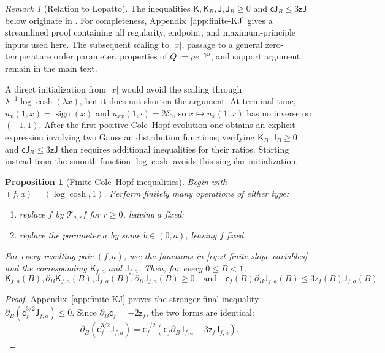 \documentclass[10pt]{amsart}
\newtheorem{proposition}[proposition]{Proposition}
\theoremstyle{definition}
\theoremstyle{remark}
\newtheorem{remark}[remark]{Remark}
\numberwithin{equation}{section}
\newcommand{\1}{\mathbf 1}
\begin{document}
\begin{remark}[Relation to Lopatto]
\label{rem:zt-finite-KJ}
The inequalities $\mathsf K,\mathsf K_B,\mathsf J,\mathsf J_B\geq0$ and $\mathsf c\mathsf J_B\leq3\mathsf z\mathsf J$ below originate in \cite[Proposition~3.6]{Lopatto2026v2}. For completeness, Appendix~\ref{app:finite-KJ} gives a streamlined proof containing all regularity, endpoint, and maximum-principle inputs used here. The subsequent scaling to $|x|$, passage to a general zero-temperature order parameter, properties of $Q:=\rho e^{-\gamma u}$, and support argument remain in the main text.

A direct initialization from $|x|$ would avoid the scaling through $\lambda^{-1}\log\cosh(\lambda x)$, but it does not shorten the argument. At terminal time, $u_x(1,x)=\operatorname{sign}(x)$ and $u_{xx}(1,\cdot)=2\delta_0$, so $x\mapsto u_x(1,x)$ has no inverse on $(-1,1)$. After the first positive Cole--Hopf evolution one obtains an explicit expression involving two Gaussian distribution functions; verifying $\mathsf K_B,\mathsf J_B\geq0$ and $\mathsf c\mathsf J_B\leq3\mathsf z\mathsf J$ then requires additional inequalities for their ratios. Starting instead from the smooth function $\log\cosh$ avoids this singular initialization.
\end{remark}

\begin{proposition}[Finite Cole--Hopf inequalities]
\label{prop:zt-finite-KJ}
Begin with $(f,a)=(\log\cosh,1)$.  Perform finitely many operations of either type:
\begin{enumerate}[label=\textup{(\roman*)},leftmargin=2.2em]
\item replace $f$ by $\mathcal T_{a,r}f$ for $r\geq0$, leaving $a$ fixed;
\item replace the parameter $a$ by some $b\in(0,a)$, leaving $f$ fixed.
\end{enumerate}
For every resulting pair $(f,a)$, use the functions in \eqref{eq:zt-finite-slope-variables} and the corresponding $\mathsf K_{f,a}$ and $\mathsf J_{f,a}$. Then, for every $0\leq B<1$,
\begin{equation*}
 \mathsf K_{f,a}(B),\partial_B\mathsf K_{f,a}(B),\mathsf J_{f,a}(B),\partial_B\mathsf J_{f,a}(B)\geq0
 \quad\text{and}\quad \mathsf c_f(B)\partial_B\mathsf J_{f,a}(B)\leq3\mathsf z_f(B)\mathsf J_{f,a}(B).
\end{equation*}
\end{proposition}

\begin{proof}
Appendix~\ref{app:finite-KJ} proves the stronger final inequality $\partial_B(\mathsf c_f^{3/2}\mathsf J_{f,a})\leq0$. Since $\partial_B\mathsf c_f=-2\mathsf z_f$, the two forms are identical:
\begin{equation*}
 \partial_B(\mathsf c_f^{3/2}\mathsf J_{f,a})
 =\mathsf c_f^{1/2}(\mathsf c_f\partial_B\mathsf J_{f,a}-3\mathsf z_f\mathsf J_{f,a}).
\end{equation*}
\end{proof}
\end{document}
